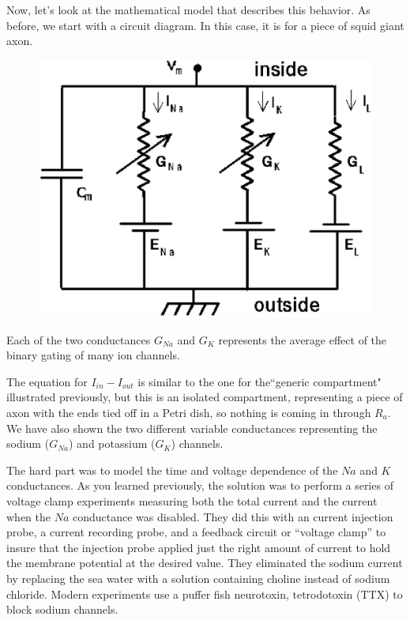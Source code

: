 \documentclass[12pt]{article}
\begin{document}
Now, let's look at the mathematical model that describes this behavior. As before, we start with a circuit diagram. In this case, it is for a piece of squid giant axon.

\begin{figure}[h]
  \centering
 \includegraphics[scale=0.75]{figures/HHcompt.eps}
  \label{fig:hhcompt}
\end{figure}

Each of the two conductances $G_{Na}$ and $G_K$ represents the average effect of the binary gating of many ion channels.

The equation for $I_{in} - I_{out}$ is similar to the one for the``generic compartment" illustrated previously, but this is an isolated compartment, representing a piece of axon with the ends tied off in a Petri dish, so nothing is coming in through $R_a$. We have also shown the two different variable conductances representing the sodium ($G_{Na}$) and potassium ($G_K$) channels.

The hard part was to model the time and voltage dependence of the $Na$ and $K$ conductances. As you learned previously, the solution was to perform a series of voltage clamp experiments measuring both the total current and the current when the $Na$ conductance was disabled. They did this with an current injection probe, a current recording probe, and a feedback circuit or ``voltage clamp'' to insure that the injection probe applied just the right amount of current to hold the membrane potential at the desired value. They eliminated the sodium current by replacing the sea water with a solution containing choline instead of sodium chloride. Modern experiments use a puffer fish neurotoxin, tetrodotoxin (TTX) to block sodium channels.
\end{document}
